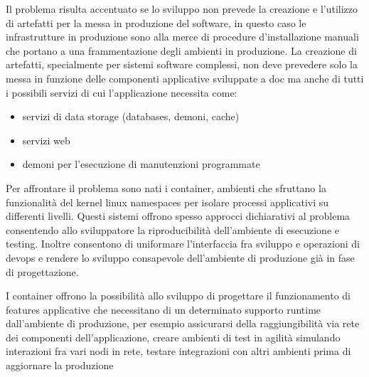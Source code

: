 Il problema risulta accentuato se lo sviluppo non prevede la creazione e l'utilizzo di artefatti per la messa in produzione del software, in questo caso le infrastrutture in produzione sono alla merce di procedure d'installazione manuali che portano a una frammentazione degli ambienti in produzione. La creazione di artefatti, specialmente per sistemi software complessi, non deve prevedere solo la messa in funzione delle componenti applicative sviluppate a doc ma anche di tutti i possibili servizi di cui l'applicazione necessita come:

\begin{itemize}
    \item servizi di data storage (databases, demoni, cache)
    \item servizi web
    \item demoni per l'esecuzione di manutenzioni programmate
\end{itemize}

Per affrontare il problema sono nati i container, ambienti che sfruttano la funzionalità del kernel linux namespaces per isolare processi applicativi su differenti livelli. Questi sistemi offrono spesso approcci dichiarativi al problema consentendo allo sviluppatore la riproducibilità dell'ambiente di esecuzione e testing. Inoltre consentono di uniformare l'interfaccia fra sviluppo e operazioni di devops e rendere lo sviluppo consapevole dell'ambiente di produzione già in fase di progettazione.

I container offrono la possibilità allo sviluppo di progettare il funzionamento di features applicative che necessitano di un determinato supporto runtime dall'ambiente di produzione, per esempio assicurarsi della raggiungibilità via rete dei componenti dell'applicazione, creare ambienti di test in agilità simulando interazioni fra vari nodi in rete, testare integrazioni con altri ambienti prima di aggiornare la produzione

